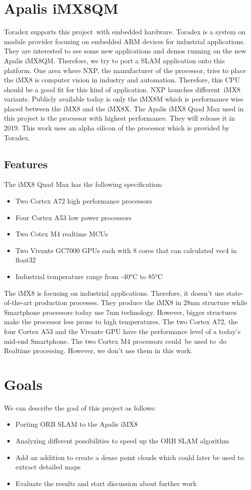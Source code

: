 \documentclass[11pt,a4paper,titlepage,oneside]{report}
\begin{document}
\section{Apalis iMX8QM}
Toradex supports this project with embedded hardware. Toradex is a system on module provider focusing on embedded ARM devices for industrial applications. They are interested to see some new applications and demos running on the new Apalis iMX8QM. Therefore, we try to port a SLAM application onto this platform. One area where NXP, the manufacturer of the processor, tries to place the iMX8 is computer vision in industry and automation. Therefore, this CPU should be a good fit for this kind of application. NXP launches different iMX8 variants. Publicly available today is only the iMX8M which is performance wise placed between the iMX8 and the iMX8X. The Apalis iMX8 Quad Max used in this project is the processor with highest performance. They will release it in 2019. This work uses an alpha silicon of the processor which is provided by Toradex.

\subsection{Features}

The iMX8 Quad Max has the following specification:
\begin{itemize}
  \item Two Cortex A72 high performance processors
  \item Four Cortex A53 low power processors
  \item Two Cotex M4 realtime MCUs
  \item Two Vivante GC7000 GPUs each with 8 cores that can calculated vec4 in float32
  \item Industrial temperature range from -40°C to 85°C
\end{itemize}

The iMX8 is focusing on industrial applications. Therefore, it doesn’t use state-of-the-art production processes. They produce the iMX8 in 28nm structure while Smartphone processors today use 7nm technology. However, bigger structures make the processor less prone to high temperatures. The two Cortex A72, the four Cortex A53 and the Vivante GPU have the performance level of a today's mid-end Smartphone. The two Cortex M4 processors could be used to do Realtime processing. However, we don’t use them in this work.

\section{Goals}
We can describe the goal of this project as follows:
\begin{itemize}
\item Porting ORB SLAM to the Apalis iMX8
\item Analyzing different possibilities to speed up the ORB SLAM algorithm
\item Add an addition to create a dense point clouds which could later be used to extract detailed maps
\item Evaluate the results and start discussion about further work
\end{itemize}
\end{document}

